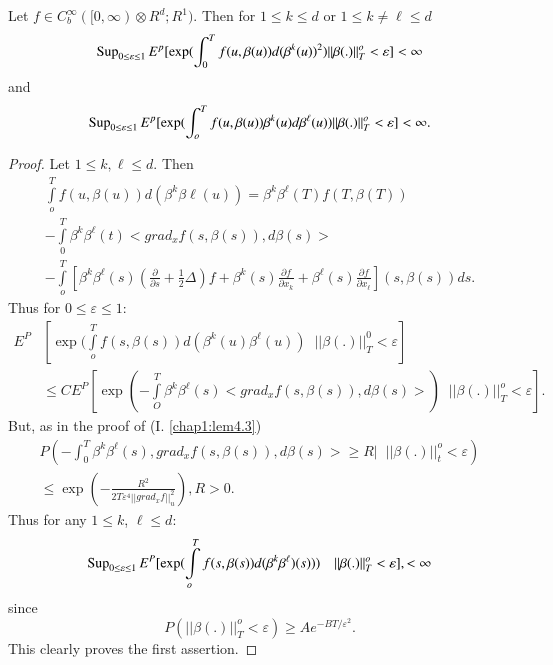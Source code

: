 \setcounter{lemma}{12}
\begin{lemma}\label{chap2:lem5.13} %
Let $f \in C^{\infty}_{b} ([0, \infty ) \otimes R^d ;
  R^1)$. Then for $1 \leq k \leq d$ or $1 \leq k \neq  \ell \leq d $ 
$$
\operatorname{Sup} _{ 0 \leq \varepsilon \leq 1} E^p [ \exp ( \int_0 ^T f(u, \beta
  (u))d (\beta ^k (u))^2) || \beta (.) ||_T^o < \varepsilon ] < \infty 
$$
and 
$$
\operatorname{Sup}_{0 \leq \varepsilon \leq 1}E^p [\exp ( \int _{o}^{T}f(u,\beta(u))
  \beta^k (u) d \beta^{\ell}(u)) || \beta (.) ||_T^o < \varepsilon ]<
\infty . 
$$
\end{lemma}

\begin{proof}
Let $1 \leq k , \ell \leq d$. Then 
\begin{gather*}
\int\limits_{o}^{T} f(u,\beta(u))d(\beta ^k \beta {\ell}(u)) = \beta^k
\beta^{\ell} (T) f(T,\beta(T)) \\
- \int\limits_0^{T}\beta^k \beta^{\ell} (t) < grad_{x} f(s,\beta (s)), 
d \beta (s) >\\ 
- \int\limits_o^T [ \beta ^k \beta^{\ell}(s)
  (\frac{\partial}{\partial s}+ \frac{1}{2}\Delta) f+\beta ^k (s)
  \frac{\partial f}{\partial x_k} + \beta^{\ell}(s) \frac{\partial
    f}{\partial x_{\ell}}](s, \beta (s)) ds . 
\end{gather*}
Thus for $0 \leq \varepsilon \leq 1$: 
\begin{align*}
E^P & [ \exp( \int\limits^T_o f(s,\beta(s)) d(\beta^k
  (u)\beta^{\ell}(u)) \;\; || \beta(.) ||^0_T < \varepsilon ]\\
& \leq CE^P [ \exp(- \int\limits_O^T \beta ^k \beta^{\ell}(s) < grad_{x}
  f(s, \beta(s)),d \beta(s)> ) \;\; || \beta(.)||_T^o < \varepsilon ] . 
\end{align*}
But, as in the proof of (I. \ref{chap1:lem4.3})		
\begin{gather*}
P( - \int_{0}^{T} \beta ^k \beta^{\ell} (s) , grad_{x} f(s,\beta (s)),
d \beta(s) > \ge R |  \;\; || \beta (.) ||_t^o < \varepsilon ) \\
\leq \exp(- \frac{R^2}{2T \varepsilon^4 || grad_{x} f|| ^2 _u }), R >
0. 
\end{gather*}\pageoriginale
Thus for any  $1 \leq  k$, $\ell \leq d$: 
 $$
 \operatorname{Sup}_{0 \leq \varepsilon \leq1} E^P [\exp(\int\limits_o^T f(s, 
   \beta(s)) d(\beta ^k \beta^{\ell})(s)))  \quad|| \beta(.) ||_T^o <
   \varepsilon], < \infty
 $$
since 
$$
P(|| \beta (.) ||_T^o  < \varepsilon ) \ge A e^{-BT/ \varepsilon ^2}.
$$
This clearly proves the first assertion.	


\end{proof}
